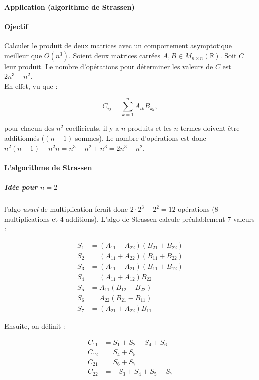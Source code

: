 \documentclass{article}
\begin{document}
			\paragraph{Application (algorithme de Strassen)}

			\paragraph{Ojectif} Calculer le produit de deux matrices avec un comportement asymptotique meilleur que $O(n^3)$. Soient deux matrices carrées $A, B \in M_{n \times n}(\mathbb R)$.
			Soit $C$ leur produit. Le nombre d'opérations pour déterminer les valeurs de $C$ est $2n^3 - n^2$.\\
			En effet, vu que :

			\[C_{ij} = \sum_{k=1}^nA_{ik}B_{kj},\]

			pour chacun des $n^2$ coefficients, il y a $n$ produits et les $n$ termes doivent être additionnés ($(n-1)$ sommes). Le nombre d'opérations est donc
			$n^2(n-1) + n^2 n = n^3-n^2+n^3 = 2n^3-n^2$.

			\paragraph{L'algorithme de Strassen}

			\subparagraph{Idée pour $n = 2$} l'algo \textit{usuel} de multiplication ferait donc $2 \cdot 2^3 - 2^2 = 12$ opérations (8 multiplications et 4 additions).
			L'algo de Strassen calcule préalablement 7 valeurs :

			\begin{align*}
				S_1 &= (A_{11} - A_{22})(B_{21} + B_{22}) \\
				S_2 &= (A_{11} + A_{22})(B_{11} + B_{22}) \\
				S_3 &= (A_{11} - A_{21})(B_{11} + B_{12}) \\
				S_4 &= (A_{11} + A_{12})B_{22} \\
				S_5 &= A_{11}(B_{12}-B_{22}) \\
				S_6 &= A_{22}(B_{21} - B_{11}) \\
				S_7 &= (A_{21} + A_{22})B_{11}
			\end{align*}

			Ensuite, on définit :

			\begin{align*}
				C_{11} &= S_1 + S_2 - S_4 + S_6 \\
				C_{12} &= S_4 + S_5 \\
				C_{21} &= S_6 + S_7 \\
				C_{22} &= -S_3 + S_4 + S_5 - S_7
			\end{align*}
\end{document}
